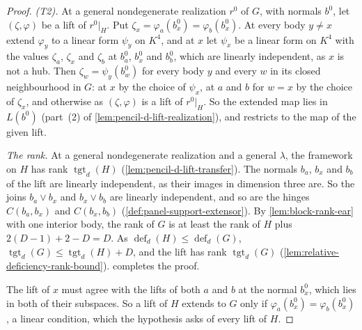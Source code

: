 \begin{proof}
  \emph{(T2).} At a general nondegenerate realization $r^0$ of $G$, with
  normals $b^0$, let $(\zeta, \varphi)$ be a lift of $r^0|_H$. Put
  $\zeta_x = \varphi_a(b^0_x) = \varphi_b(b^0_x)$. At every body
  $y \ne x$ extend $\varphi_y$ to a linear form $\psi_y$ on $K^4$, and at
  $x$ let $\psi_x$ be a linear form on $K^4$ with the values $\zeta_a$,
  $\zeta_x$ and $\zeta_b$ at $b^0_a$, $b^0_x$ and $b^0_b$, which are
  linearly independent, as $x$ is not a hub. Then
  $\zeta_w = \psi_y(b^0_w)$ for every body $y$ and every $w$ in its
  closed neighbourhood in $G$: at $x$ by the choice of $\psi_x$, at $a$
  and $b$ for $w = x$ by the choice of $\zeta_x$, and otherwise as
  $(\zeta, \varphi)$ is a lift of $r^0|_H$. So the extended map lies in
  $L(b^0)$ (part~(2) of \cref{lem:pencil-d-lift-realization}), and
  restricts to the map of the given lift.

  \emph{The rank.} At a general nondegenerate realization and a general
  $\lambda$, the framework on $H$ has rank $\operatorname{tgt}_d(H)$
  (\cref{lem:pencil-d-lift-transfer}). The normals $b_a$, $b_x$ and $b_b$
  of the lift are linearly independent, as their images in dimension
  three are. So the joins $b_a \vee b_x$ and $b_x \vee b_b$ are linearly
  independent, and so are the hinges $C(b_a, b_x)$ and $C(b_x, b_b)$
  (\cref{def:panel-support-extensor}). By \cref{lem:block-rank-ear} with
  one interior body, the rank of $G$ is at least the rank of $H$ plus
  $2(D - 1) + 2 - D = D$. As $\operatorname{def}_d(H) \le
  \operatorname{def}_d(G)$, $\operatorname{tgt}_d(G) \le
  \operatorname{tgt}_d(H) + D$, and the lift has rank
  $\operatorname{tgt}_d(G)$ (\cref{lem:relative-deficiency-rank-bound}).
   completes the proof.

  The lift of $x$ must agree with the lifts of both $a$ and $b$ at the
  normal $b^0_x$, which lies in both of their subspaces. So a lift of $H$
  extends to $G$ only if $\varphi_a(b^0_x) = \varphi_b(b^0_x)$, a linear
  condition, which the hypothesis asks of every lift of $H$.
\end{proof}

